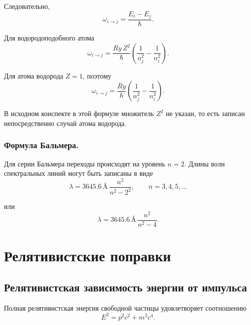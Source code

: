 \documentclass[../final.tex]{subfiles}
\begin{document}
Следовательно,
%
\begin{equation*}
    \omega_{i\rightarrow j}
    =
    \frac{E_i-E_j}{\hbar}.
\end{equation*}

Для водородоподобного атома
%
\[
    \omega_{i\rightarrow j}
    =
    \frac{Ry\,Z^2}{\hbar}
    \left(
        \frac{1}{n_j^2}
        -
        \frac{1}{n_i^2}
    \right).
\]

Для атома водорода $Z=1$, поэтому
%
\begin{equation*}
    \omega_{i\rightarrow j}
    =
    \frac{Ry}{\hbar}
    \left(
        \frac{1}{n_j^2}
        -
        \frac{1}{n_i^2}
    \right).
\end{equation*}

\remark
В исходном конспекте в этой формуле множитель $Z^2$ не указан,
то есть записан непосредственно случай атома водорода.


\medskip
\subsubsection{Формула Бальмера.}

Для серии Бальмера переходы происходят на уровень $n=2$.
Длины волн спектральных линий могут быть записаны в виде
%
\begin{equation*}
    \lambda
    =
    3645.6\,\text{\AA}\,
    \frac{n^2}{n^2-2^2},
    \qquad
    n=3,4,5,\ldots
\end{equation*}

или
%
\begin{equation*}
    \lambda
    =
    3645.6\,\text{\AA}\,
    \frac{n^2}{n^2-4}.
\end{equation*}


\section{Релятивистские поправки}


\subsection{Релятивистская зависимость энергии от импульса}

Полная релятивистская энергия свободной частицы удовлетворяет
соотношению
%
\begin{equation*}
    E^2
    =
    p^2c^2+m^2c^4.
\end{equation*}
\end{document}
